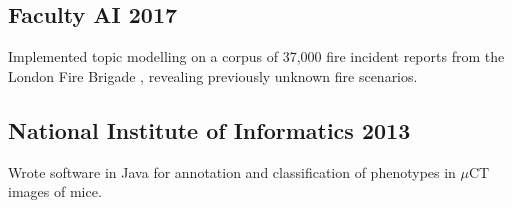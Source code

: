 \subsection{Faculty AI \hfill 2017}
    \begin{list2}
        \item Implemented topic modelling on a corpus of 37,000 fire incident reports from the London Fire Brigade , revealing previously unknown fire scenarios.
    \end{list2}


\subsection{National Institute of Informatics \hfill 2013}
    \begin{list2}
      \item Wrote software in Java for annotation and classification of phenotypes in $\mu$CT images of mice.
    \end{list2}

